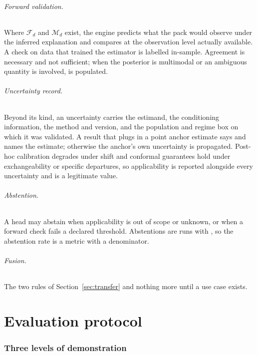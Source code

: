 \documentclass[11pt,a4paper]{article}
\begin{document}
\paragraph{Forward validation.} Where $\mathcal F_d$ and $\mathcal M_d$ exist, the engine predicts what the pack would observe under the inferred explanation and compares at the observation level actually available. A check on data that trained the estimator is labelled in-sample. Agreement is necessary and not sufficient; when the posterior is multimodal or an ambiguous quantity is involved,  is populated.

\paragraph{Uncertainty record.} Beyond its kind, an uncertainty carries the estimand, the conditioning information, the method and version, and the population and regime box on which it was validated. A result that plugs in a point anchor estimate says  and names the estimate; otherwise the anchor's own uncertainty is propagated. Post-hoc calibration degrades under shift \citep{ovadia2019} and conformal guarantees hold under exchangeability or specific departures, so applicability is reported alongside every uncertainty and  is a legitimate value.

\paragraph{Abstention.} A head may abstain when applicability is out of scope or unknown, or when a forward check fails a declared threshold. Abstentions are runs with , so the abstention rate is a metric with a denominator.

\paragraph{Fusion.} The two rules of Section~\ref{sec:transfer} and nothing more until a use case exists.

\part{Evaluation protocol}

\section{Three levels of demonstration}
\end{document}
